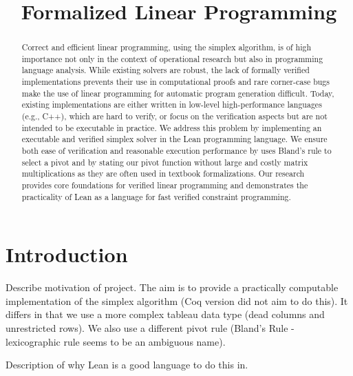 \documentclass[11pt]{article} %
\title{Formalized Linear Programming}
\date{}
\begin{document}

\lstset{language=lean}
\lstset{basicstyle=\normalsize}
\maketitle
\begin{abstract}
Correct and efficient linear programming, using the simplex
algorithm, is of high importance not only in the context of
operational research but also in programming language analysis.
While existing solvers are robust, the lack of formally verified
implementations prevents their use in computational proofs and
rare corner-case bugs make the use of linear programming for
automatic program generation difficult.
Today, existing implementations are either written in low-level
high-performance languages (e.g., C++), which are hard to verify, or
focus on the verification aspects but are not intended to be executable in practice.
We address this problem by implementing an executable and verified
simplex solver in the Lean programming language.
We ensure both ease of verification and reasonable execution
performance by uses Bland's rule to select a pivot and by stating our
pivot function without large and costly matrix multiplications as
they are often used in textbook formalizations.
Our research provides core foundations for verified linear
programming and demonstrates the practicality of Lean as a language
for fast verified constraint programming.

\end{abstract}

\section{Introduction}
\color{red}Describe motivation of project.
The aim is to provide a practically computable implementation of the simplex algorithm (Coq version did not aim to do this). It differs in that we use a more complex tableau data type (dead columns and unrestricted rows). We also use a different pivot rule (Bland's Rule - lexicographic rule seems to be an ambiguous name).

Description of why Lean is a good language to do this in.\color{black}
\end{document}
